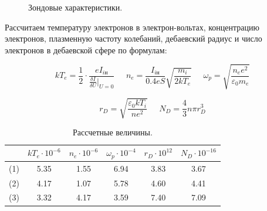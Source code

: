 \documentclass[a4paper,12pt]{article} %
\begin{document}
\begin{figure}[H]\label{rlx}
 	\caption{Зондовые характеристики.}
\label{fig:image2}
\end{figure}

Рассчитаем температуру электронов в электрон-вольтах, концентрацию электронов, плазменную частоту колебаний, дебаевский радиус и число электронов в дебаевской сфере по формулам:

\begin{equation}
    kT_e = \frac{1}{2}\cdot \frac{eI_{i\text{н}}}{\frac{\delta I}{\delta U}|_{U = 0}}\;\;\;\;\;n_e = \frac{I_{i\text{н}}}{0.4 eS}\sqrt{\frac{m_i}{2kT_e}}\;\;\;\;\;\omega_p = \sqrt{\frac{n_e e^2}{\varepsilon_0 m_e}}
    \label{eq3:ref}
\end{equation}

\begin{equation}
    r_D = \sqrt{\frac{\varepsilon_0kT_i}{ne^2}} \;\;\;\;\;  N_D = \frac{4}{3}n\pi r_D^3
    \label{eq4:ref}
\end{equation}

\begin{table}[H]
\caption{\label{tab:canonsummary} Рассчетные величины.}
\begin{center}
\begin{tabular}{|c|c|c|c|c|c|}
\hline
$\;$ & $kT_e \cdot 10^{-6}$ & $n_e \cdot 10^{-6}$ & $\omega_p\cdot 10^{-4}$ & $r_D\cdot 10^{12}$ & $N_D\cdot 10^{-16}$\\
\hline
(1) & 5.35 & 1.55 & 6.94 & 3.83 & 3.67\\
\hline
(2) & 4.17 & 1.07 & 5.78 & 4.60 & 4.41\\
\hline
(3) & 3.32 & 4.17 & 3.59 & 7.40 & 7.09\\
\hline
\end{tabular}
\end{center}
\label{table1:ref}
\end{table}
\end{document}
